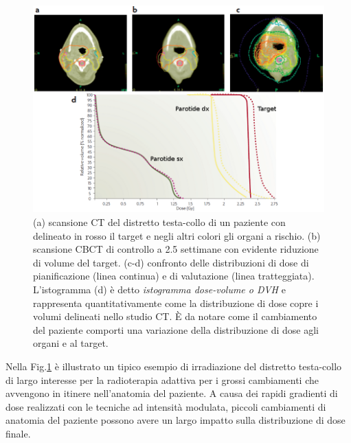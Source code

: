 \begin{figure}[!t]
\centering
\centerline{
\includegraphics[width=1.2\textwidth]{./cap3/HN_DVH.png}}
\caption{(a) scansione CT del distretto testa-collo di un paziente con delineato in rosso il target e negli altri colori gli organi a rischio. (b) scansione CBCT di controllo a 2.5 settimane con evidente riduzione di volume del target. (c-d) confronto delle distribuzioni di dose di pianificazione (linea continua) e di valutazione (linea tratteggiata). L'istogramma (d) è detto \textit{istogramma dose-volume o DVH} e rappresenta quantitativamente come la distribuzione di dose copre i volumi delineati nello studio CT. \`E da notare come il cambiamento del paziente comporti una variazione della distribuzione di dose agli organi e al target.}
\label{fig:HN_DVH}
\end{figure}

 Nella Fig.\ref{fig:HN_DVH} è illustrato un tipico esempio di irradiazione del distretto testa-collo di largo interesse per la radioterapia adattiva per i grossi cambiamenti che avvengono in itinere nell'anatomia del paziente. A causa dei rapidi gradienti di dose realizzati con le tecniche ad intensità modulata, piccoli cambiamenti di anatomia del paziente possono avere un largo impatto sulla distribuzione di dose finale. 
 
